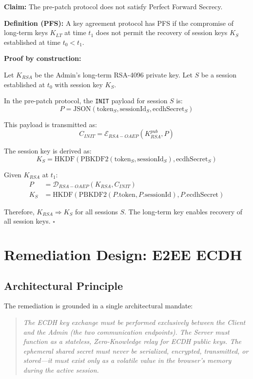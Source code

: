 \documentclass[12pt,a4paper]{article}
\begin{document}
\begin{proofbox}
\textbf{Claim:} The pre-patch protocol does not satisfy Perfect Forward Secrecy.

\textbf{Definition (PFS):} A key agreement protocol has PFS if the compromise of long-term keys $K_{LT}$ at time $t_1$ does not permit the recovery of session keys $K_S$ established at time $t_0 < t_1$.

\textbf{Proof by construction:}

Let $K_{RSA}$ be the Admin's long-term RSA-4096 private key. Let $S$ be a session established at $t_0$ with session key $K_S$.

In the pre-patch protocol, the \texttt{INIT} payload for session $S$ is:
$$P = \text{JSON}(\text{token}_S, \text{sessionId}_S, \text{ecdhSecret}_S)$$

This payload is transmitted as:
$$C_{INIT} = \mathcal{E}_{RSA-OAEP}(K_{RSA}^{pub}, P)$$

The session key is derived as:
$$K_S = \text{HKDF}(\text{PBKDF2}(\text{token}_S, \text{sessionId}_S), \text{ecdhSecret}_S)$$

Given $K_{RSA}$ at $t_1$:
\begin{align}
    P &= \mathcal{D}_{RSA-OAEP}(K_{RSA}, C_{INIT}) \\
    K_S &= \text{HKDF}(\text{PBKDF2}(P.\text{token}, P.\text{sessionId}), P.\text{ecdhSecret})
\end{align}

Therefore, $K_{RSA} \Rightarrow K_S$ for all sessions $S$. The long-term key enables recovery of all session keys. $\square$
\end{proofbox}

\section{Remediation Design: E2EE ECDH}

\subsection{Architectural Principle}

The remediation is grounded in a single architectural mandate:

\begin{quote}
\textit{The ECDH key exchange must be performed exclusively between the Client and the Admin (the two communication endpoints). The Server must function as a stateless, Zero-Knowledge relay for ECDH public keys. The ephemeral shared secret must never be serialized, encrypted, transmitted, or stored---it must exist only as a volatile value in the browser's memory during the active session.}
\end{quote}
\end{document}
